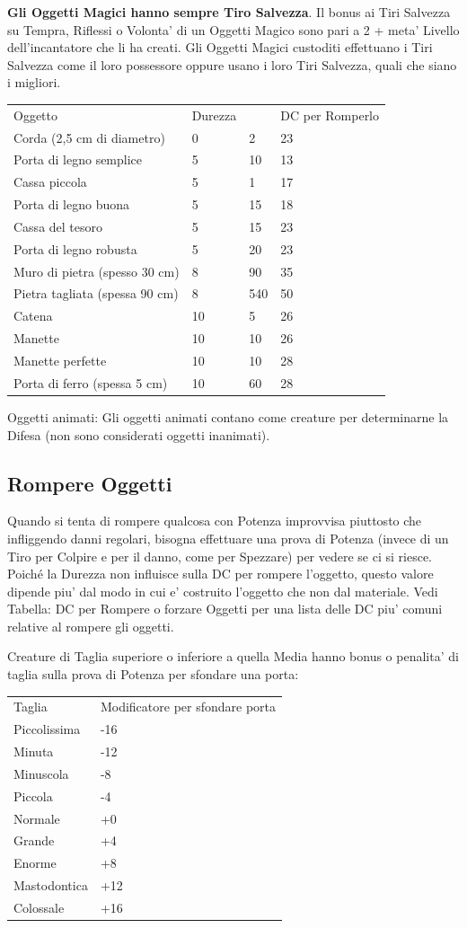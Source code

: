 \documentclass[a4paper,11pt,twoside,openany]{dndbook}
\begin{document}
{\textbf{Gli Oggetti Magici hanno sempre Tiro Salvezza}. Il bonus ai
Tiri Salvezza su Tempra, Riflessi o Volonta' di un Oggetti Magico sono
pari a 2 + meta' Livello dell'incantatore che li ha creati. Gli Oggetti
Magici custoditi effettuano i Tiri Salvezza come il loro possessore
oppure usano i loro Tiri Salvezza, quali che siano i migliori.

\bigskip

\begin{tabular}[c]{@{}llll@{}}
\toprule 
Oggetto & Durezza & & DC per Romperlo\tabularnewline
Corda (2,5 cm di diametro) & 0 & 2 & 23\tabularnewline
Porta di legno semplice & 5 & 10 & 13\tabularnewline
Cassa piccola & 5 & 1 & 17\tabularnewline
Porta di legno buona & 5 & 15 & 18\tabularnewline
Cassa del tesoro & 5 & 15 & 23\tabularnewline
Porta di legno robusta & 5 & 20 & 23\tabularnewline
Muro di pietra (spesso 30 cm) & 8 & 90 & 35\tabularnewline
Pietra tagliata (spessa 90 cm) & 8 & 540 & 50\tabularnewline
Catena & 10 & 5 & 26\tabularnewline
Manette & 10 & 10 & 26\tabularnewline
Manette perfette & 10 & 10 & 28\tabularnewline
Porta di ferro (spessa 5 cm) & 10 & 60 & 28\tabularnewline
\bottomrule
\end{tabular}

\bigskip

Oggetti animati: Gli oggetti animati contano come creature per determinarne
la Difesa (non sono considerati oggetti inanimati).

\subsection{Rompere Oggetti}

\label{rompere-oggetti}

Quando si tenta di rompere qualcosa con Potenza improvvisa piuttosto che infliggendo danni regolari, bisogna effettuare una prova di Potenza (invece di un Tiro per Colpire e per il danno, come per Spezzare) per vedere se ci si riesce. Poiché la Durezza non influisce sulla DC per rompere l'oggetto, questo valore dipende piu' dal modo in cui e' costruito l'oggetto che non dal materiale. Vedi Tabella: DC per Rompere o forzare Oggetti per una lista delle DC piu' comuni relative al rompere gli oggetti.

Creature di Taglia superiore o inferiore a quella Media hanno bonus o penalita' di taglia sulla prova di Potenza per sfondare una porta:

\bigskip

\begin{tabular}[c]{@{}ll@{}}
\toprule 
Taglia & Modificatore per sfondare porta\tabularnewline
Piccolissima & -16\tabularnewline
Minuta & -12\tabularnewline
Minuscola & -8\tabularnewline
Piccola & -4\tabularnewline
Normale & +0\tabularnewline
Grande & +4\tabularnewline
Enorme & +8\tabularnewline
Mastodontica & +12\tabularnewline
Colossale & +16\tabularnewline
\bottomrule
\end{tabular}

}
\end{document}
